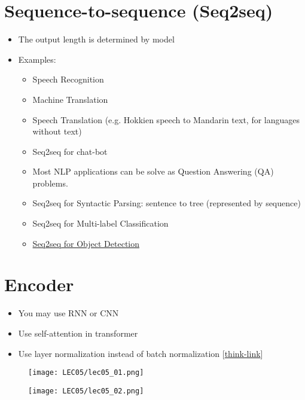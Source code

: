 \documentclass[11pt]{book}
\begin{document}
\section{Sequence-to-sequence (Seq2seq)}
\begin{itemize}
    \item The output length is determined by model
    \item Examples:
    \begin{itemize}
    \item
        Speech Recognition
    \item
        Machine Translation
    \item
        Speech Translation (e.g. Hokkien speech to Mandarin text, for
        languages without text)
    \item
        Seq2seq for chat-bot
    \item
        Most NLP applications can be solve as Question Answering (QA)
        problems.
    \item
        Seq2seq for Syntactic Parsing: sentence to tree (represented by
        sequence)
    \item
        Seq2seq for Multi-label Classification
    \item
        \href{https://arxiv.org/abs/2005.12872}{Seq2seq for Object
        Detection}
    \end{itemize}
\end{itemize}

\section{Encoder}
\begin{itemize}
    \item
        You may use RNN or CNN
    \item
        Use self-attention in transformer
    \item
        Use layer normalization instead of batch normalization
        {[}\href{https://arxiv.org/abs/2003.07845}{think-link}{]}
\end{itemize}

\begin{figure}[H]
    \centering
    \texttt{[image: LEC05/lec05\_01.png]}
\end{figure}

\begin{figure}[H]
    \centering
    \texttt{[image: LEC05/lec05\_02.png]}
\end{figure}
\end{document}
